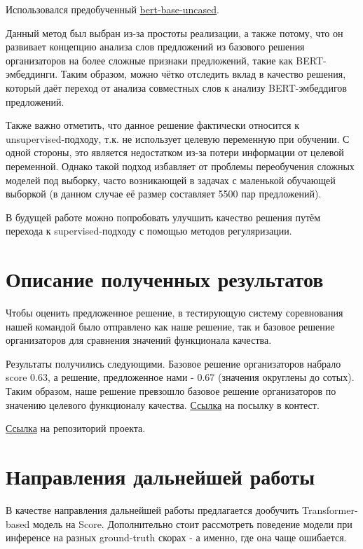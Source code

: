 \documentclass[12pt]{article}
\begin{document}
Использовался предобученный \href{https://huggingface.co/bert-base-uncased}{bert-base-uncased}.

Данный метод был выбран из-за простоты реализации, а также потому, что он развивает концепцию анализа слов предложений из базового решения организаторов на более сложные признаки предложений, такие как BERT-эмбеддинги. Таким образом, можно чётко отследить вклад в качество решения, который даёт переход от анализа совместных слов к анализу BERT-эмбеддигов предложений.

Также важно отметить, что данное решение фактически относится к unsupervised-подходу, т.к. не использует целевую переменную при обучении. С одной стороны, это является недостатком из-за потери информации от целевой переменной. Однако такой подход избавляет от проблемы переобучения сложных моделей под выборку, часто возникающей в задачах с маленькой обучающей выборкой (в данном случае её размер составляет 5500 пар предложений).

В будущей работе можно попробовать улучшить качество решения путём перехода к supervised-подходу с помощью методов регуляризации.

\newpage


\section{Описание полученных результатов}
Чтобы оценить предложенное решение, в тестирующую систему соревнования нашей командой было отправлено как наше решение, так и базовое решение организаторов для сравнения значений функционала качества.

Результаты получились следующими. Базовое решение организаторов набрало score 0.63, а решение, предложенное нами - 0.67 (значения округлены до сотых). Таким образом, наше решение превзошло базовое решение организаторов по значению целевого функционалу качества. \href{https://codalab.lisn.upsaclay.fr/my/competition/submission/588203/detailed_results/}{Ссылка} на посылку в контест.

\href{https://github.com/wwwwwert/NLP_project}{Ссылка} на репозиторий проекта.

\section{Направления дальнейшей работы}
В качестве направления дальнейшей работы предлагается дообучить Transformer-based модель на Score. Дополнительно стоит рассмотреть поведение модели при инференсе на разных ground-truth скорах - а именно, где она чаще ошибается.
\end{document}
